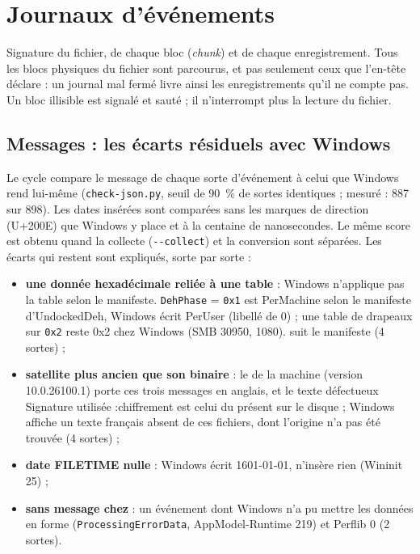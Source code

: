 \documentclass[11pt,a4paper,oneside]{report}
\begin{document}
\section{Journaux d'événements}

Signature du fichier, de chaque bloc (\emph{chunk}) et de chaque
enregistrement. Tous les blocs physiques du fichier sont parcourus, et pas
seulement ceux que l'en-tête déclare : un journal mal fermé livre ainsi les
enregistrements qu'il ne compte pas. Un bloc illisible est signalé et sauté ; il
n'interrompt plus la lecture du fichier.

\subsection*{Messages : les écarts résiduels avec Windows}

Le cycle compare le message de chaque sorte d'événement à celui que Windows rend
lui-même (\texttt{check-json.py}, seuil de 90~\% de sortes identiques ; mesuré :
887 sur 898). Les dates insérées sont comparées sans les marques de direction
(U+200E) que Windows y place et à la centaine de nanosecondes. Le même score est
obtenu quand la collecte (\texttt{-{}-collect}) et la conversion sont séparées.
Les écarts qui restent sont expliqués, sorte par sorte :
\begin{itemize}
  \item \textbf{une donnée hexadécimale reliée à une table} : Windows n'applique
        pas la table selon le manifeste. \texttt{DehPhase} = \texttt{0x1} est
        \og PerMachine \fg{} selon le manifeste d'UndockedDeh, Windows écrit
        \og PerUser \fg{} (libellé de 0) ; une table de drapeaux sur
        \texttt{0x2} reste \og 0x2 \fg{} chez Windows (SMB 30950, 1080).
        \wac{} suit le manifeste (4 sortes) ;
  \item \textbf{satellite plus ancien que son binaire} : le
         de la machine (version
        10.0.26100.1) porte ces trois messages en anglais, et le texte
        défectueux \og Signature utilisée :chiffrement \fg{} est celui du
         présent sur le disque ; Windows affiche un texte
        français absent de ces fichiers, dont l'origine n'a pas été trouvée
        (4 sortes) ;
  \item \textbf{date FILETIME nulle} : Windows écrit 1601-01-01, \wac{}
        n'insère rien (Wininit 25) ;
  \item \textbf{sans message chez \wac{}} : un événement dont Windows n'a pu
        mettre les données en forme (\texttt{ProcessingErrorData},
        AppModel-Runtime 219) et Perflib 0 (2 sortes).
\end{itemize}
\end{document}
